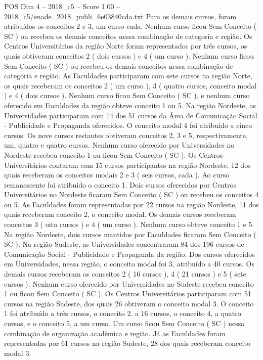 \begin{textsample}{POS Dim 4 – 2018\_c5 – Score 1.00 – 2018\_c5/enade\_2018\_publi\_6e03840cda.txt}
Para os demais cursos, foram atribuídos os conceitos 2 e 3, um curso cada.
Nenhum curso ficou Sem Conceito ( SC ) ou recebeu os demais conceitos nessa combinação de categoria e região.
Os Centros Universitários da região Norte foram representados por três cursos, os quais obtiveram conceitos 2 ( dois cursos ) e 4 ( um curso ).
Nenhum curso ficou Sem Conceito ( SC ) ou recebeu os demais conceitos nessa combinação de categoria e região.
As Faculdades participaram com sete cursos na região Norte, os quais receberam os conceitos 2 ( um curso ), 3 ( quatro cursos, conceito modal ) e 4 ( dois cursos ).
Nenhum curso ficou Sem Conceito ( SC ), e nenhum curso oferecido em Faculdades da região obteve conceito 1 ou 5.
Na região Nordeste, as Universidades participaram com 14 dos 51 cursos da Área de Comunicação Social - Publicidade e Propaganda oferecidos.
O conceito modal 4 foi atribuído a cinco cursos.
Os nove cursos restantes obtiveram conceitos 2, 3 e 5, respectivamente, um, quatro e quatro cursos.
Nenhum curso oferecido por Universidades no Nordeste recebeu conceito 1 ou ficou Sem Conceito ( SC ).
Os Centros Universitários contaram com 15 cursos participantes na região Nordeste, 12 dos quais receberam os conceitos modais 2 e 3 ( seis cursos, cada ).
Ao curso remanescente foi atribuído o conceito 1.
Dois cursos oferecidos por Centros Universitários no Nordeste ficaram Sem Conceito ( SC ) ou recebeu os conceitos 4 ou 5.
As Faculdades foram representadas por 22 cursos na região Nordeste, 11 dos quais receberam conceito 2, o conceito modal.
Os demais cursos receberam conceitos 3 ( oito cursos ) e 4 ( um curso ).
Nenhum curso obteve conceito 1 e 5.
Na região Nordeste, dois cursos mantidos por Faculdades ficaram Sem Conceito ( SC ).
Na região Sudeste, as Universidades concentraram 84 dos 196 cursos de Comunicação Social - Publicidade e Propaganda da região.
Dos cursos oferecidos em Universidades, nessa região, o conceito modal foi 3, atribuído a 40 cursos.
Os demais cursos receberam os conceitos 2 ( 16 cursos ), 4 ( 21 cursos ) e 5 ( sete cursos ).
Nenhum curso oferecido por Universidades no Sudeste recebeu conceito 1 ou ficou Sem Conceito ( SC ).
Os Centros Universitários participaram com 51 cursos na região Sudeste, dos quais 26 obtiveram o conceito modal 3.
O conceito 1 foi atribuído a três cursos, o conceito 2, a 16 cursos, o conceito 4, a quatro cursos, e o conceito 5, a um curso.
Um curso ficou Sem Conceito ( SC ) nessa combinação de organização acadêmica e região.
Já as Faculdades foram representadas por 61 cursos na região Sudeste, 28 dos quais receberam conceito modal 3.

\end{textsample}
